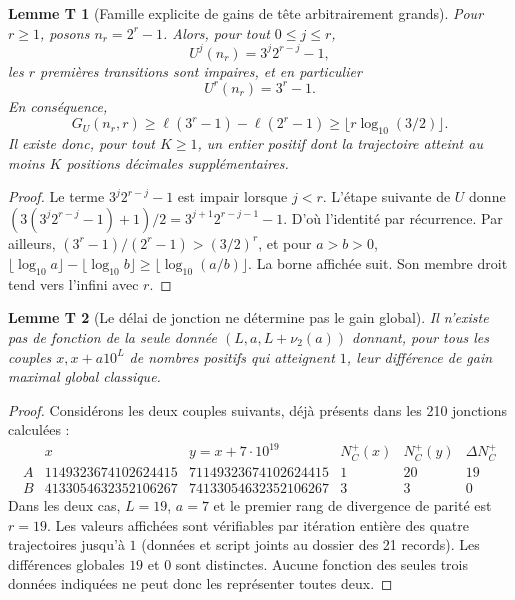 \documentclass[11pt,a4paper]{article}
\newtheorem{lemmet}{Lemme T}
\newcommand{\ellg}{\ell}
\newcommand{\UU}{U}
\begin{document}
\begin{lemmet}[Famille explicite de gains de tête arbitrairement grands]
Pour $r\ge1$, posons $n_r=2^r-1$. Alors, pour tout $0\le j\le r$,
\[
 \boxed{\UU^j(n_r)=3^j2^{r-j}-1},
\]
les $r$ premières transitions sont impaires, et en particulier
\[
 \UU^r(n_r)=3^r-1.
\]
En conséquence,
\[
 \boxed{G_U(n_r,r)\ge\ellg(3^r-1)-\ellg(2^r-1)
 \ge\lfloor r\log_{10}(3/2)\rfloor.}
\]
Il existe donc, pour tout $K\ge1$, un entier positif dont la trajectoire atteint au moins $K$ positions décimales supplémentaires.
\end{lemmet}
\begin{proof}
Le terme $3^j2^{r-j}-1$ est impair lorsque $j<r$. L'étape suivante de $\UU$ donne
\((3(3^j2^{r-j}-1)+1)/2=3^{j+1}2^{r-j-1}-1\).
D'où l'identité par récurrence. Par ailleurs,
\((3^r-1)/(2^r-1)>(3/2)^r\), et pour $a>b>0$,
\(\lfloor\log_{10}a\rfloor-\lfloor\log_{10}b\rfloor\ge\lfloor\log_{10}(a/b)\rfloor\).
La borne affichée suit. Son membre droit tend vers l'infini avec $r$.
\end{proof}

\begin{lemmet}[Le délai de jonction ne détermine pas le gain global]
Il n'existe pas de fonction de la seule donnée $(L,a,L+\nu_2(a))$ donnant, pour tous les couples $x,x+a10^L$ de nombres positifs qui atteignent $1$, leur différence de gain maximal global classique.
\end{lemmet}
\begin{proof}
Considérons les deux couples suivants, déjà présents dans les 210 jonctions calculées :
\[
\begin{array}{c|r|r|r|r|r}
 &x&y=x+7\cdot10^{19}&N_C^+(x)&N_C^+(y)&\Delta N_C^+\\\hline
 A&1149323674102624415&71149323674102624415&1&20&19\\
 B&4133054632352106267&74133054632352106267&3&3&0
\end{array}
\]
Dans les deux cas, $L=19$, $a=7$ et le premier rang de divergence de parité est $r=19$. Les valeurs affichées sont vérifiables par itération entière des quatre trajectoires jusqu'à $1$ (données et script joints au dossier des 21 records). Les différences globales $19$ et $0$ sont distinctes. Aucune fonction des seules trois données indiquées ne peut donc les représenter toutes deux.
\end{proof}
\end{document}
